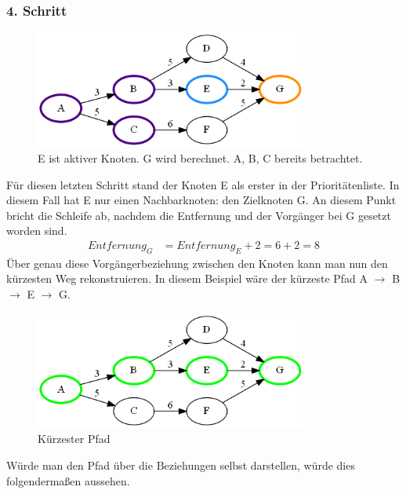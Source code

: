 \documentclass[11pt]{scrreprt}
\begin{document}
			\subsubsection{4. Schritt}
			\begin{figure}[ht]
				\centering
				\includegraphics[width=0.8\textwidth]{Graphs/Example4}
				\caption{E ist aktiver Knoten. G wird berechnet. A, B, C bereits betrachtet.}
			\end{figure}
			\FloatBarrier
			Für diesen letzten Schritt stand der Knoten E als erster in der Prioritätenliste. In diesem Fall hat E nur einen Nachbarknoten: den Zielknoten G.
			An diesem Punkt bricht die Schleife ab, nachdem die Entfernung und der Vorgänger bei G gesetzt worden sind.
			\begin{align*}
			Entfernung_G &= Entfernung_E + 2 = 6 + 2 = 8
			\end{align*}
			Über genau diese Vorgängerbeziehung zwischen den Knoten kann man nun den kürzesten Weg rekonstruieren.
			In diesem Beispiel wäre der kürzeste Pfad A $\rightarrow$ B $\rightarrow$ E $\rightarrow$ G.
		
			\begin{figure}[ht]
				\centering
				\includegraphics[width=0.8\textwidth]{Graphs/ExamplePathFull}
				\caption{Kürzester Pfad}
			\end{figure}
			\FloatBarrier
			
			\newpage
			Würde man den Pfad über die Beziehungen selbst darstellen, würde dies folgendermaßen aussehen.
			
\end{document}
